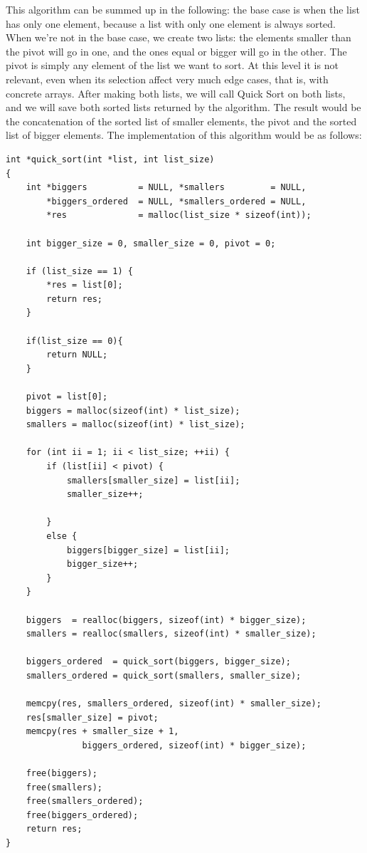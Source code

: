 \documentclass[a4paper]{article}
\begin{document}
This algorithm can be summed up in the following: the base case is when the list
has only one element, because a list with only one element is always sorted.
When we're not in the base case, we create two lists: the elements smaller than
the pivot will go in one, and the ones equal or bigger will go in the other.
The pivot is simply any element of the list we want to sort. At this level it is
not relevant, even when its selection affect very much edge cases, that is,
with concrete arrays. After making both lists, we will call Quick Sort on both
lists, and we will save both sorted lists returned by the algorithm. The result
would be the concatenation of the sorted list of smaller elements, the pivot and
the sorted list of bigger elements.
The implementation of this algorithm would be as follows:

\noindent
\begin{minipage}[H]{\linewidth}
\mbox{}
\begin{lstlisting}[style=C,
caption={Implementation of Quick Sort},
label={lst:quick_sort}]
int *quick_sort(int *list, int list_size)
{
    int *biggers          = NULL, *smallers         = NULL,
        *biggers_ordered  = NULL, *smallers_ordered = NULL,
        *res              = malloc(list_size * sizeof(int));

    int bigger_size = 0, smaller_size = 0, pivot = 0;

    if (list_size == 1) {
        *res = list[0];
        return res;
    }

    if(list_size == 0){
        return NULL;
    }

    pivot = list[0];
    biggers = malloc(sizeof(int) * list_size);
    smallers = malloc(sizeof(int) * list_size);

    for (int ii = 1; ii < list_size; ++ii) {
        if (list[ii] < pivot) {
            smallers[smaller_size] = list[ii];
            smaller_size++;

        }
        else {
            biggers[bigger_size] = list[ii];
            bigger_size++;
        }
    }

    biggers  = realloc(biggers, sizeof(int) * bigger_size);
    smallers = realloc(smallers, sizeof(int) * smaller_size);

    biggers_ordered  = quick_sort(biggers, bigger_size);
    smallers_ordered = quick_sort(smallers, smaller_size);

    memcpy(res, smallers_ordered, sizeof(int) * smaller_size);
    res[smaller_size] = pivot;
    memcpy(res + smaller_size + 1,
               biggers_ordered, sizeof(int) * bigger_size);

    free(biggers);
    free(smallers);
    free(smallers_ordered);
    free(biggers_ordered);
    return res;
}
\end{lstlisting}
\end{minipage}
\end{document}
